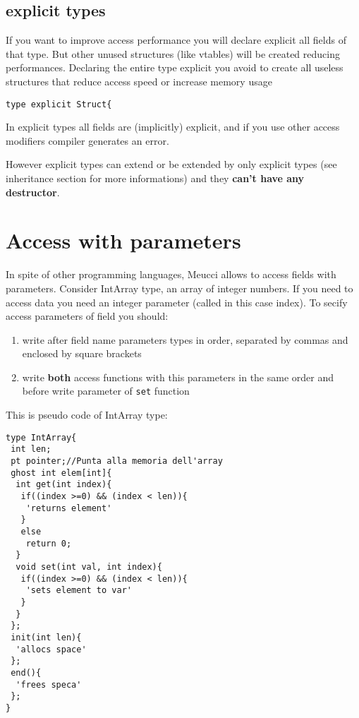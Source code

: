 \documentclass[10pt]{book}%
\newcommand{\code}[1]{\texttt{#1}}
\renewcommand{\emph}[1]{\textbf{#1}}
\newenvironment{codeenv}{
\begin{mdframed}[backgroundcolor=black!20,topline=false,leftline=false,rightline=false,bottomline=false]
}
{\end{mdframed}}
\begin{document}
\subsection{explicit types}
If you want to improve access performance you will declare explicit all fields of that type. But other unused structures (like vtables) will be created reducing performances. Declaring the entire type explicit you avoid to create all useless structures that reduce access speed or increase memory usage
\begin{codeenv}
\begin{verbatim}
type explicit Struct{
\end{verbatim}
\end{codeenv}
In explicit types all fields are (implicitly) explicit, and if you use other access modifiers compiler generates an error.
 
However explicit types can extend or be extended by only explicit types (see inheritance section for more informations) and they \emph{can't have any destructor}.

\section{Access with parameters}
In spite of other programming languages, Meucci allows to access fields with parameters. Consider IntArray type, an array of integer numbers. If you need to access data you need an integer parameter (called in this case index). To secify access parameters of field you should:
\begin{enumerate}
\item write after field name parameters types in order, separated by commas and enclosed by square brackets
\item write \emph{both} access functions with this parameters in the same order and before write parameter of \code{set} function
\end{enumerate}

This is pseudo code of IntArray type:
\begin{codeenv}
\begin{verbatim}
type IntArray{
 int len;
 pt pointer;//Punta alla memoria dell'array
 ghost int elem[int]{
  int get(int index){
   if((index >=0) && (index < len)){
    'returns element'
   }
   else
    return 0;
  }
  void set(int val, int index){
   if((index >=0) && (index < len)){
    'sets element to var'
   }
  }
 };
 init(int len){
  'allocs space'
 };
 end(){
  'frees speca'
 };
}
\end{verbatim}
\end{codeenv}
\end{document}
